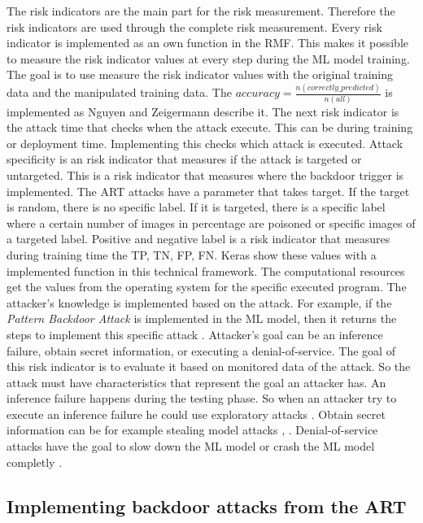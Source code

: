The risk indicators are the main part for the risk measurement. Therefore the risk indicators are used through the complete risk measurement. Every risk indicator is implemented as an own function in the RMF. This makes it possible to measure the risk indicator values at every step during the ML model training. The goal is to use measure the risk indicator values with the original training data and the manipulated training data. The $accuracy=\frac{n(correctly\_predicted)}{n(all)}$ is implemented as Nguyen and Zeigermann \cite{9783960101925} describe it. The next risk indicator is the attack time that checks when the attack execute. This can be during training or deployment time. Implementing this checks which attack is executed. Attack specificity is an risk indicator that measures if the attack is targeted or untargeted. This is a risk indicator that measures where the backdoor trigger is implemented. The ART attacks have a parameter that takes target. If the target is random, there is no specific label. If it is targeted, there is a specific label where a certain number of images in percentage are poisoned or specific images of a targeted label. Positive and negative label is a risk indicator that measures during training time the TP, TN, FP, FN. Keras show these values with a implemented function in this technical framework. The computational resources get the values from the operating system for the specific executed program. The attacker's knowledge is implemented based on the attack. For example, if the \textit{Pattern Backdoor Attack} is implemented in the ML model, then it returns the steps to implement this specific attack \cite{bsi_2013}. Attacker's goal \cite{DBLP:journals/corr/abs-2012-04884} can be an inference failure, obtain secret information, or executing a denial-of-service. The goal of this risk indicator is to evaluate it based on monitored data of the attack. So the attack must have characteristics that represent the goal an attacker has. An inference failure happens during the testing phase. So when an attacker try to execute an inference failure he could use exploratory attacks \cite{tabassi2019taxonomy}. Obtain secret information can be for example stealing model attacks \cite{DBLP:journals/corr/abs-2105-00623}, \cite{DBLP:journals/wicomm/ZhangLGQTZ20}. Denial-of-service attacks have the goal to slow down the ML model or crash the ML model completly \cite{DBLP:journals/sensors/VaccariAC20}.

\subsection{Implementing backdoor attacks from the ART}

